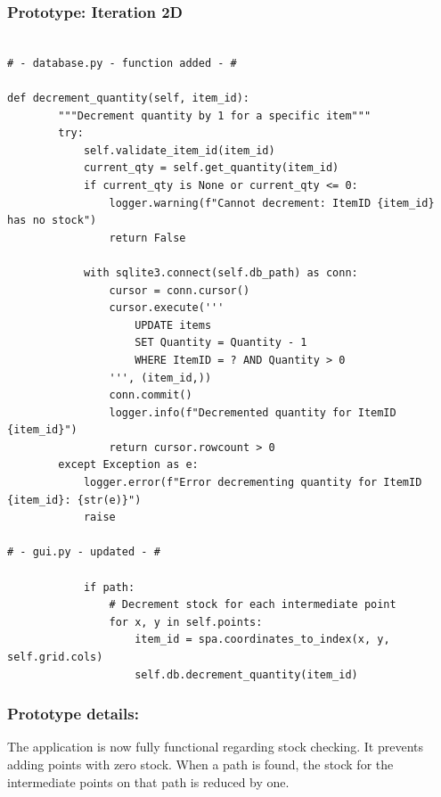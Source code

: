 \newpage
\subsubsection*{Prototype: Iteration 2D}

\begin{verbatim}

# - database.py - function added - #

def decrement_quantity(self, item_id):
        """Decrement quantity by 1 for a specific item"""
        try:
            self.validate_item_id(item_id)
            current_qty = self.get_quantity(item_id)
            if current_qty is None or current_qty <= 0:
                logger.warning(f"Cannot decrement: ItemID {item_id} has no stock")
                return False
                
            with sqlite3.connect(self.db_path) as conn:
                cursor = conn.cursor()
                cursor.execute('''
                    UPDATE items 
                    SET Quantity = Quantity - 1
                    WHERE ItemID = ? AND Quantity > 0
                ''', (item_id,))
                conn.commit()
                logger.info(f"Decremented quantity for ItemID {item_id}")
                return cursor.rowcount > 0
        except Exception as e:
            logger.error(f"Error decrementing quantity for ItemID {item_id}: {str(e)}")
            raise

# - gui.py - updated - #

            if path:
                # Decrement stock for each intermediate point
                for x, y in self.points:
                    item_id = spa.coordinates_to_index(x, y, self.grid.cols)
                    self.db.decrement_quantity(item_id)

\end{verbatim}

\newpage

\subsubsection{Prototype details:}
The application is now fully functional regarding stock checking. It prevents adding points with zero stock. When a path is found, the stock for the intermediate points on that path is reduced by one.

